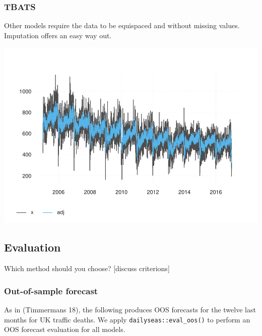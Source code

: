 \documentclass[
]{article}
\newenvironment{Shaded}{\begin{snugshade}}{\end{snugshade}}
\newcommand{\KeywordTok}[1]{\textcolor[rgb]{0.13,0.29,0.53}{\textbf{#1}}}
\newcommand{\NormalTok}[1]{#1}
\newcommand{\OperatorTok}[1]{\textcolor[rgb]{0.81,0.36,0.00}{\textbf{#1}}}
\newcommand{\StringTok}[1]{\textcolor[rgb]{0.31,0.60,0.02}{#1}}
\begin{document}
\hypertarget{tbats}{%
\subsubsection{TBATS}\label{tbats}}

Other models require the data to be equispaced and without missing
values. Imputation offers an easy way out.

\begin{Shaded}
\end{Shaded}

\includegraphics{overview_files/figure-latex/tbats-1.pdf}

\hypertarget{evaluation}{%
\subsection{Evaluation}\label{evaluation}}

Which method should you choose? {[}discuss criterions{]}

\hypertarget{out-of-sample-forecast}{%
\subsubsection{Out-of-sample forecast}\label{out-of-sample-forecast}}

As in (Timmermans 18), the following produces OOS forecasts for the
twelve last months for UK traffic deaths. We apply
\texttt{dailyseas::eval\_oos()} to perform an OOS forecast evaluation
for all models.
\end{document}
